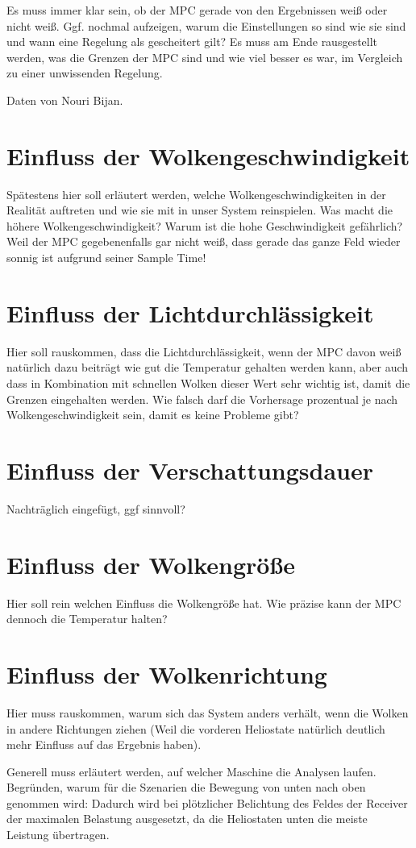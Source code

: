 Es muss immer klar sein, ob der MPC gerade von den Ergebnissen weiß oder nicht weiß.
Ggf. nochmal aufzeigen, warum die Einstellungen so sind wie sie sind und wann eine Regelung als gescheitert gilt?
Es muss am Ende rausgestellt werden, was die Grenzen der MPC sind und wie viel besser es war, im Vergleich zu einer unwissenden Regelung.

Daten von Nouri Bijan.



\section{Einfluss der Wolkengeschwindigkeit} \label{sec_EinflussGeschwindigkeit}
Spätestens hier soll erläutert werden, welche Wolkengeschwindigkeiten in der Realität auftreten und wie sie mit in unser System reinspielen.
Was macht die höhere Wolkengeschwindigkeit? Warum ist die hohe Geschwindigkeit gefährlich?
Weil der MPC gegebenenfalls gar nicht weiß, dass gerade das ganze Feld wieder sonnig ist aufgrund seiner Sample Time!

\section{Einfluss der Lichtdurchlässigkeit} \label{sec_EinflussLichtdurchlässigkeit}
Hier soll rauskommen, dass die Lichtdurchlässigkeit, wenn der MPC davon weiß natürlich dazu beiträgt wie gut die Temperatur gehalten werden kann, aber auch dass in Kombination mit schnellen Wolken dieser Wert sehr wichtig ist, damit die Grenzen eingehalten werden.
Wie falsch darf die Vorhersage prozentual je nach Wolkengeschwindigkeit sein, damit es keine Probleme gibt?

\section{Einfluss der Verschattungsdauer} \label{sec_Verschattungsdauer}
Nachträglich eingefügt, ggf sinnvoll?

\section{Einfluss der Wolkengröße} \label{sec_EinflussGröße}
Hier soll rein welchen Einfluss die Wolkengröße hat.
Wie präzise kann der MPC dennoch die Temperatur halten?

\section{Einfluss der Wolkenrichtung} \label{sec_EinflussRichtung}
Hier muss rauskommen, warum sich das System anders verhält, wenn die Wolken in andere Richtungen ziehen (Weil die vorderen Heliostate natürlich deutlich mehr Einfluss auf das Ergebnis haben).

Generell muss erläutert werden, auf welcher Maschine die Analysen laufen.
Begründen, warum für die Szenarien die Bewegung von unten nach oben genommen wird: Dadurch wird bei plötzlicher Belichtung des Feldes der Receiver der maximalen Belastung ausgesetzt, da die Heliostaten unten die meiste Leistung übertragen.
